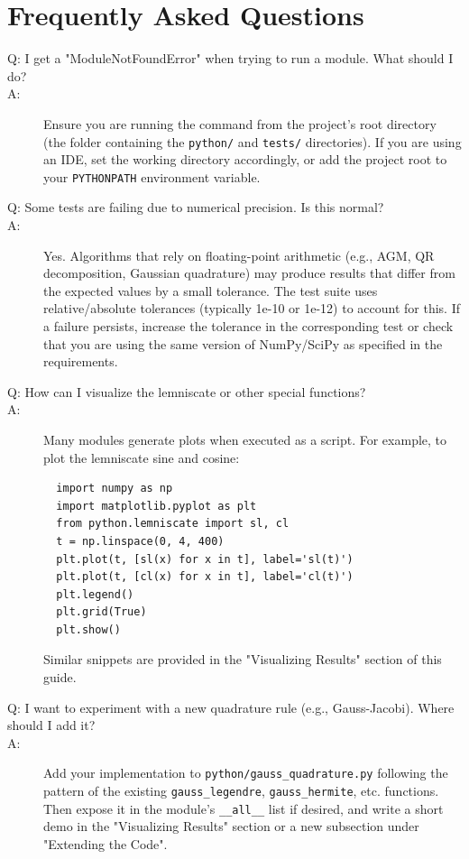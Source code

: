 \documentclass[11pt,a4paper]{article}
\begin{document}
\section{Frequently Asked Questions}
\begin{description}
  \item[Q: I get a "ModuleNotFoundError" when trying to run a module. What should I do?]
  \item[A:] Ensure you are running the command from the project's root directory (the folder containing the {\tt python/} and {\tt tests/} directories). If you are using an IDE, set the working directory accordingly, or add the project root to your {\tt PYTHONPATH} environment variable.
  \item[Q: Some tests are failing due to numerical precision. Is this normal?]
  \item[A:] Yes. Algorithms that rely on floating-point arithmetic (e.g., AGM, QR decomposition, Gaussian quadrature) may produce results that differ from the expected values by a small tolerance. The test suite uses relative/absolute tolerances (typically 1e-10 or 1e-12) to account for this. If a failure persists, increase the tolerance in the corresponding test or check that you are using the same version of NumPy/SciPy as specified in the requirements.
  \item[Q: How can I visualize the lemniscate or other special functions?]
  \item[A:] Many modules generate plots when executed as a script. For example, to plot the lemniscate sine and cosine:
  \begin{verbatim}
  import numpy as np
  import matplotlib.pyplot as plt
  from python.lemniscate import sl, cl
  t = np.linspace(0, 4, 400)
  plt.plot(t, [sl(x) for x in t], label='sl(t)')
  plt.plot(t, [cl(x) for x in t], label='cl(t)')
  plt.legend()
  plt.grid(True)
  plt.show()
  \end{verbatim}
  Similar snippets are provided in the "Visualizing Results" section of this guide.
  \item[Q: I want to experiment with a new quadrature rule (e.g., Gauss-Jacobi). Where should I add it?]
  \item[A:] Add your implementation to {\tt python/gauss\_quadrature.py} following the pattern of the existing {\tt gauss\_legendre}, {\tt gauss\_hermite}, etc. functions. Then expose it in the module's {\tt \_\_all\_\_} list if desired, and write a short demo in the "Visualizing Results" section or a new subsection under "Extending the Code".

\end{description}
\end{document}
